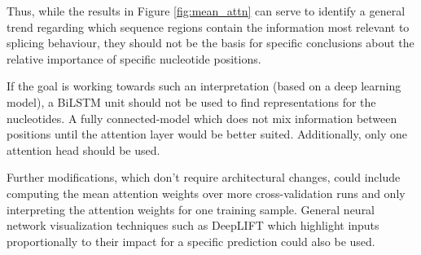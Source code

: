 Thus, while the results in Figure \ref{fig:mean_attn} can serve to identify a general trend regarding which sequence regions contain the information most relevant to splicing behaviour, they should not be the basis for specific conclusions about the relative importance of specific nucleotide positions. 

If the goal is working towards such an interpretation (based on a deep learning model), a BiLSTM unit should not be used to find representations for the nucleotides. A fully connected-model which does not mix information between positions until the attention layer would be better suited. Additionally, only one attention head should be used. 

Further modifications, which don't require architectural changes, could include computing the mean attention weights over more cross-validation runs and only interpreting the attention weights for one training sample. General neural network visualization techniques such as DeepLIFT \cite{deeplift} which highlight inputs proportionally to their impact for a specific prediction could also be used.

%

















